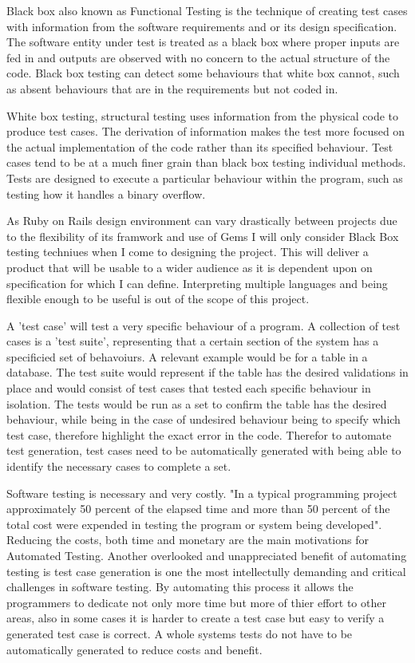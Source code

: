 \documentclass{article}
\begin{document}
\par Black box also known as Functional Testing is the technique of creating test cases with information from the software requirements and or its design specification. The software entity under test is treated as a black box where proper inputs are fed in and outputs are observed with no concern to the actual structure of the code. Black box testing can detect some behaviours that white box cannot, such as absent behaviours that are in the requirements but not coded in.\cite{nidhra2012blackbox}\cite{young2008software}
\par White box testing, structural testing uses information from the physical code to produce test cases. The derivation of information makes the test more focused on the actual implementation of the code rather than its specified behaviour. Test cases tend to be at a much finer grain than black box testing individual methods. Tests are designed to execute a particular behaviour within the program, such as testing how it handles a binary overflow.\cite{nidhra2012blackbox}\cite{young2008software}
\par As Ruby on Rails design environment can vary drastically between projects due to the flexibility of its framwork and use of Gems I will only consider Black Box testing techniues when I come to designing the project. This will deliver a product that will be usable to a wider audience as it is dependent upon on specification for which I can define. Interpreting multiple languages and being flexible enough to be useful is out of the scope of this project.
\par A 'test case' will test a very specific behaviour of a program. A collection of test cases is a 'test suite', representing that a certain section of the system has a specificied set of behavoiurs. A relevant example would be for a table in a database. The test suite would represent if the table has the desired validations in place and would consist of test cases that tested each specific behaviour in isolation. The tests would be run as a set to confirm the table has the desired behaviour, while being in the case of undesired behaviour being to specify which test case, therefore highlight the exact error in the code. Therefor to automate test generation, test cases need to be automatically generated with being able to identify the necessary cases to complete a set.
\par Software testing is necessary and very costly. "In a typical programming project approximately 50 percent of the elapsed time and more than 50 percent of the total cost were expended in testing the program or system being developed"\cite{myers2011art}. Reducing the costs, both time and monetary are the main motivations for Automated Testing. Another overlooked and unappreciated benefit of automating testing is test case generation is one the most intellectully demanding and critical challenges in software testing.\cite{anand2013orchestrated} By automating this process it allows the programmers to dedicate not only more time but more of thier effort to other areas, also in some cases it is harder to create a test case but easy to verify a generated test case is correct. A whole systems tests do not have to be automatically generated to reduce costs and benefit.
\end{document}
